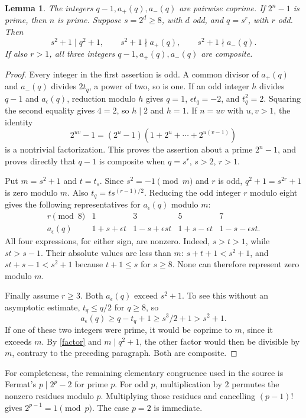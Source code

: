 \documentclass[11pt,a4paper]{article}
\newtheorem{lemma}[theorem]{Lemma}
\begin{document}
\begin{lemma}\label{arithmetic}
The integers $q-1,a_+(q),a_-(q)$ are pairwise coprime.
If $2^n-1$ is prime, then $n$ is prime.
Suppose $s=2^d\ge8$, with $d$ odd, and $q=s^r$, with $r$ odd.
Then
\[
 s^2+1\mid q^2+1,\qquad
 s^2+1\nmid a_+(q),\qquad s^2+1\nmid a_-(q).
\]
If also $r>1$, all three integers $q-1,a_+(q),a_-(q)$ are composite.
\end{lemma}
\begin{proof}
Every integer in the first assertion is odd. A common divisor of
$a_+(q)$ and $a_-(q)$ divides $2t_q$, a power of two, so is one.
If an odd integer $h$ divides $q-1$ and $a_\epsilon(q)$, reduction
modulo $h$ gives $q=1$, $\epsilon t_q=-2$, and $t_q^2=2$.
Squaring the second equality gives $4=2$, so $h\mid2$ and $h=1$.
If $n=uv$ with $u,v>1$, the identity
\[
 2^{uv}-1=(2^u-1)(1+2^u+\cdots+2^{u(v-1)})
\]
is a nontrivial factorization. This proves the assertion about a
prime $2^n-1$, and proves directly that $q-1$ is composite when
$q=s^r$, $s>2$, $r>1$.

Put $m=s^2+1$ and $t=t_s$. Since $s^2=-1\pmod m$ and $r$ is odd,
$q^2+1=s^{2r}+1$ is zero modulo $m$. Also
$t_q=t s^{(r-1)/2}$. Reducing the odd integer $r$ modulo eight gives
the following representatives for $a_\epsilon(q)$ modulo $m$:
\[
\begin{array}{c|cccc}
 r\pmod8&1&3&5&7\\ \hline
 a_\epsilon(q)&1+s+\epsilon t&1-s+\epsilon st&
                1+s-\epsilon t&1-s-\epsilon st.
\end{array}
\]
All four expressions, for either sign, are nonzero. Indeed,
$s>t>1$, while $st>s-1$. Their absolute values are less than $m$:
$s+t+1<s^2+1$, and $st+s-1<s^2+1$ because $t+1\le s$ for
$s\ge8$. None can therefore represent zero modulo $m$.

Finally assume $r\ge3$. Both $a_\epsilon(q)$ exceed $s^2+1$.
To see this without an asymptotic estimate, $t_q\le q/2$ for
$q\ge8$, so
\[
 a_\epsilon(q)\ge q-t_q+1\ge s^3/2+1>s^2+1.
\]
If one of these two integers were prime, it would be coprime to
$m$, since it exceeds $m$. By \eqref{factor} and $m\mid q^2+1$,
the other factor would then be divisible by $m$, contrary to the
preceding paragraph. Both are composite.
\end{proof}

For completeness, the remaining elementary congruence used in the
source is Fermat's $p\mid2^p-2$ for prime $p$. For odd $p$,
multiplication by $2$ permutes the nonzero residues modulo $p$.
Multiplying those residues and cancelling $(p-1)!$ gives
$2^{p-1}=1\pmod p$. The case $p=2$ is immediate.
\end{document}
